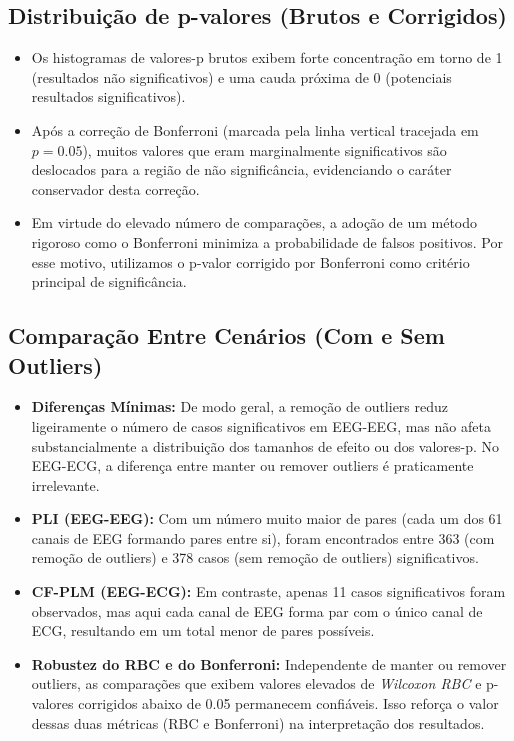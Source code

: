 \subsection{Distribuição de p-valores (Brutos e Corrigidos)}

\begin{itemize}
    \item Os histogramas de valores-p brutos exibem forte concentração em torno de 1 (resultados não significativos) e uma cauda próxima de 0 (potenciais resultados significativos).
    \item Após a correção de Bonferroni (marcada pela linha vertical tracejada em $p=0.05$), muitos valores que eram marginalmente significativos são deslocados para a região de não significância, evidenciando o caráter conservador desta correção.
    \item Em virtude do elevado número de comparações, a adoção de um método rigoroso como o Bonferroni minimiza a probabilidade de falsos positivos. Por esse motivo, utilizamos o p-valor corrigido por Bonferroni como critério principal de significância.
\end{itemize}


\subsection{Comparação Entre Cenários (Com e Sem Outliers)}
\begin{itemize}
    \item \textbf{Diferenças Mínimas:} De modo geral, a remoção de outliers reduz ligeiramente o número de casos significativos em EEG-EEG, mas não afeta substancialmente a distribuição dos tamanhos de efeito ou dos valores-p. No EEG-ECG, a diferença entre manter ou remover outliers é praticamente irrelevante.

    \item \textbf{PLI (EEG-EEG):} Com um número muito maior de pares (cada um dos 61 canais de EEG formando pares entre si), foram encontrados entre 363 (com remoção de outliers) e 378 casos (sem remoção de outliers) significativos.

    \item \textbf{CF-PLM (EEG-ECG):} Em contraste, apenas 11 casos significativos foram observados, mas aqui cada canal de EEG forma par com o único canal de ECG, resultando em um total menor de pares possíveis.
    
    \item \textbf{Robustez do RBC e do Bonferroni:} Independente de manter ou remover outliers, as comparações que exibem valores elevados de \emph{Wilcoxon RBC} e p-valores corrigidos abaixo de 0.05 permanecem confiáveis. Isso reforça o valor dessas duas métricas (RBC e Bonferroni) na interpretação dos resultados.
\end{itemize}


